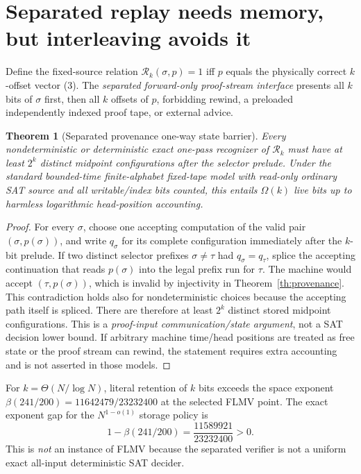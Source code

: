 \documentclass[11pt]{article}
\newtheorem{theorem}{Theorem}
\begin{document}
\section{Separated replay needs memory, but interleaving avoids it}
Define the fixed-source relation \(\mathcal R_k(\sigma,p)=1\) iff \(p\) equals the physically correct \(k\)-offset vector (3). The \emph{separated forward-only proof-stream interface} presents all \(k\) bits of \(\sigma\) first, then all \(k\) offsets of \(p\), forbidding rewind, a preloaded independently indexed proof tape, or external advice.
\begin{theorem}[Separated provenance one-way state barrier]\label{th:replay}
Every nondeterministic or deterministic exact one-pass recognizer of \(\mathcal R_k\) must have at least \(2^k\) distinct midpoint configurations after the selector prelude. Under the standard bounded-time finite-alphabet fixed-tape model with read-only ordinary SAT source and all writable/index bits counted, this entails \(\Omega(k)\) live bits up to harmless logarithmic head-position accounting.
\end{theorem}
\begin{proof}
For every \(\sigma\), choose one accepting computation of the valid pair \((\sigma,p(\sigma))\), and write \(q_\sigma\) for its complete configuration immediately after the \(k\)-bit prelude. If two distinct selector prefixes \(\sigma\ne\tau\) had \(q_\sigma=q_\tau\), splice the accepting continuation that reads \(p(\sigma)\) into the legal prefix run for \(\tau\). The machine would accept \((\tau,p(\sigma))\), which is invalid by injectivity in Theorem~\ref{th:provenance}. This contradiction holds also for nondeterministic choices because the accepting path itself is spliced. There are therefore at least \(2^k\) distinct stored midpoint configurations. This is a \emph{proof-input communication/state argument}, not a SAT decision lower bound. If arbitrary machine time/head positions are treated as free state or the proof stream can rewind, the statement requires extra accounting and is not asserted in those models.
\end{proof}
For \(k=\Theta(N/\log N)\), literal retention of \(k\) bits exceeds the space exponent \(\beta(241/200)=11642479/23232400\) at the selected FLMV point. The exact exponent gap for the \(N^{1-o(1)}\) storage policy is
\[1-\beta(241/200)=\frac{11589921}{23232400}>0.\tag{4}\]
This is \emph{not} an instance of FLMV because the separated verifier is not a uniform exact all-input deterministic SAT decider.
\end{document}
